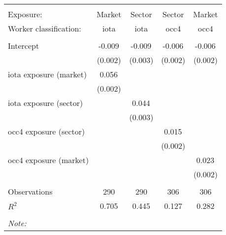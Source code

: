 \begin{tabular}{@{\extracolsep{5pt}}lcccc}
\\[-1.8ex]\hline
\hline \\[-1.8ex]
\hline \\[-1.8ex]
 Exposure: & Market & Sector & Sector & Market \\
 Worker classification: & iota & iota & occ4 & occ4 \\
 \hline &  &  &  &  \\
 Intercept & -0.009$^{}$ & -0.009$^{}$ & -0.006$^{}$ & -0.006$^{}$ \\
  & (0.002) & (0.003) & (0.002) & (0.002) \\
 iota exposure (market) & 0.056$^{}$ & & & \\
  & (0.002) & & & \\
 iota exposure (sector) & & 0.044$^{}$ & & \\
  & & (0.003) & & \\
 occ4 exposure (sector) & & & 0.015$^{}$ & \\
  & & & (0.002) & \\
 occ4 exposure (market) & & & & 0.023$^{}$ \\
  & & & & (0.002) \\
\hline \\[-1.8ex]
 Observations & 290 & 290 & 306 & 306 \\
 $R^2$ & 0.705 & 0.445 & 0.127 & 0.282 \\
\hline
\hline \\[-1.8ex]
\textit{Note:}\end{tabular}